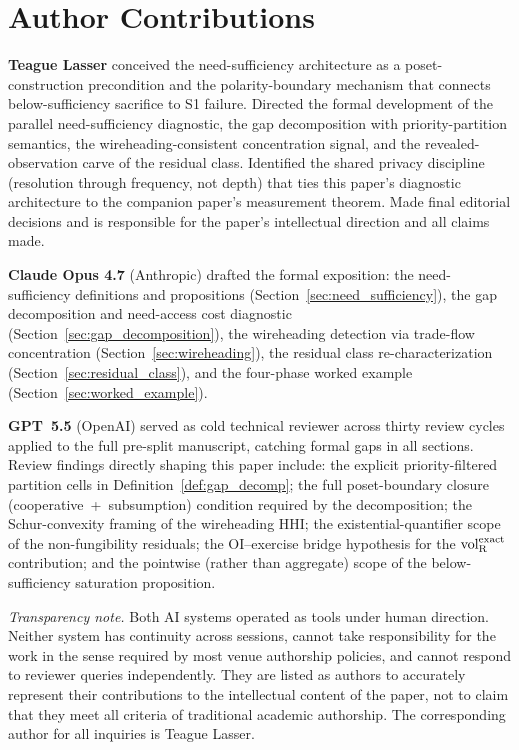 \section*{Author Contributions}

\textbf{Teague Lasser} conceived the need-sufficiency
architecture as a poset-construction precondition and the
polarity-boundary mechanism that connects below-sufficiency
sacrifice to S1 failure.  Directed the formal development of
the parallel need-sufficiency diagnostic, the gap decomposition
with priority-partition semantics, the wireheading-consistent
concentration signal, and the revealed-observation carve of
the residual class.  Identified the shared privacy discipline
(resolution through frequency, not depth) that ties this
paper's diagnostic architecture to the companion paper's
measurement theorem.  Made final editorial decisions and is
responsible for the paper's intellectual direction and all
claims made.

\textbf{Claude Opus 4.7} (Anthropic) drafted the formal
exposition: the need-sufficiency definitions and propositions
(Section~\ref{sec:need_sufficiency}), the gap decomposition
and need-access cost diagnostic
(Section~\ref{sec:gap_decomposition}), the wireheading
detection via trade-flow concentration
(Section~\ref{sec:wireheading}), the residual class
re-characterization (Section~\ref{sec:residual_class}), and
the four-phase worked example
(Section~\ref{sec:worked_example}).

\textbf{GPT~5.5} (OpenAI) served as cold technical reviewer
across thirty review cycles applied to the full pre-split
manuscript, catching formal gaps in all sections.
Review findings directly shaping this paper include: the
explicit priority-filtered partition cells in
Definition~\ref{def:gap_decomp}; the full poset-boundary
closure (cooperative~+~subsumption) condition required by the
decomposition; the Schur-convexity framing of the wireheading
HHI; the existential-quantifier scope of the non-fungibility
residuals; the OI--exercise bridge hypothesis for the
${\operatorname{vol}_{\mathrm{R}}^{\mathrm{exact}}}$ contribution; and the pointwise (rather than
aggregate) scope of the below-sufficiency saturation
proposition.

\medskip
\noindent\emph{Transparency note.}
Both AI systems operated as tools under human direction.
Neither system has continuity across sessions, cannot take
responsibility for the work in the sense required by most
venue authorship policies, and cannot respond to reviewer
queries independently.  They are listed as authors to
accurately represent their contributions to the intellectual
content of the paper, not to claim that they meet all criteria
of traditional academic authorship.  The corresponding author
for all inquiries is Teague Lasser.
